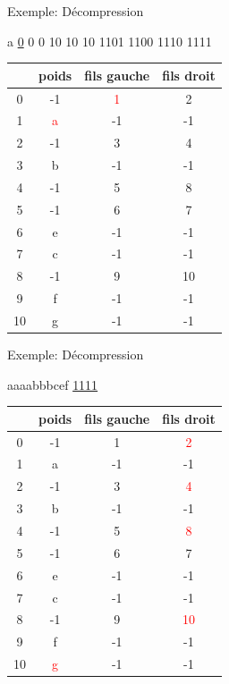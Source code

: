 \documentclass[french]{beamer}
\begin{document}
\begin{frame}{Exemple: Décompression}
	\begin{center}
	a \underline{0}  0 0 10 10 10 1101 1100 1110 1111\\
	\end{center}
		\begin{center}	
		\begin{tabular}{|c|c|c|c|}
		\hline
		 & poids & fils gauche & fils droit \\
		\hline 0 & -1 & \textcolor{red}{1} & 2 \\
		\hline 1 & \textcolor{red}{a} & -1 & -1\\
		\hline  2 & -1 & 3 & 4 \\
		\hline 3& b & -1 & -1 \\
		\hline 4&-1 & 5 & 8 \\
		\hline 5&-1 & 6 & 7 \\
		\hline 6&e & -1 & -1 \\
		\hline 7&c & -1 & -1 \\
		\hline 8& -1 & 9 & 10 \\
		\hline 9&f & -1 & -1\\
		\hline 10&g & -1 & -1\\
		\hline
		\end{tabular}
	\end{center}
	
\end{frame}

\begin{frame}{Exemple: Décompression}
	\begin{center}
	aaaabbbcef \underline{1111}\\
	\end{center}
		\begin{center}	
		\begin{tabular}{|c|c|c|c|}
		\hline
		 & poids & fils gauche & fils droit \\
		\hline 0 & -1 & 1 & \textcolor{red}{2} \\
		\hline 1 & a & -1 & -1\\
		\hline  2 & -1 & 3 & \textcolor{red}{4} \\
		\hline 3& b & -1 & -1 \\
		\hline 4&-1 & 5 & \textcolor{red}{8} \\
		\hline 5&-1 & 6 & 7 \\
		\hline 6&e & -1 & -1 \\
		\hline 7&c & -1 & -1 \\
		\hline 8& -1 & 9 & \textcolor{red}{10} \\
		\hline 9&f & -1 & -1\\
		\hline 10&\textcolor{red}{g} & -1 & -1\\
		\hline
		\end{tabular}
	\end{center}
	
\end{frame}
\end{document}
